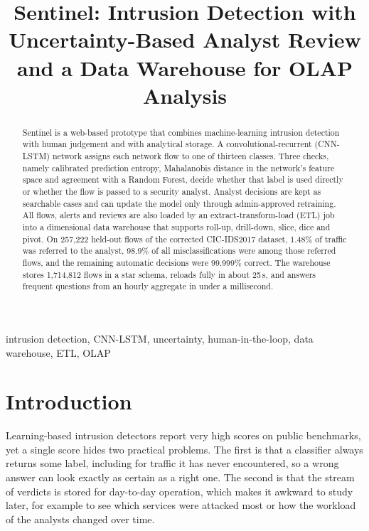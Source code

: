 \documentclass[conference]{IEEEtran}
\begin{document}
\title{Sentinel: Intrusion Detection with Uncertainty-Based Analyst Review and a Data Warehouse for OLAP Analysis}

\author{
\and
{}
}

\maketitle

\begin{abstract}
Sentinel is a web-based prototype that combines machine-learning intrusion detection with
human judgement and with analytical storage. A convolutional-recurrent (CNN-LSTM) network assigns
each network flow to one of thirteen classes. Three checks, namely calibrated prediction entropy,
Mahalanobis distance in the network's feature space and agreement with a Random Forest, decide
whether that label is used directly or whether the flow is passed to a security analyst. Analyst
decisions are kept as searchable cases and can update the model only through admin-approved
retraining. All flows, alerts and reviews are also loaded by an extract-transform-load (ETL) job
into a dimensional data warehouse that supports roll-up, drill-down, slice, dice and pivot. On
257,222 held-out flows of the corrected CIC-IDS2017 dataset, 1.48\% of traffic was referred to
the analyst, 98.9\% of all misclassifications were among those referred flows, and the remaining
automatic decisions were 99.999\% correct. The warehouse stores 1,714,812 flows in a star schema, reloads
fully in about 25\,s, and answers frequent questions from an hourly aggregate in under a
millisecond.
\end{abstract}

\begin{IEEEkeywords}
intrusion detection, CNN-LSTM, uncertainty, human-in-the-loop, data warehouse, ETL, OLAP
\end{IEEEkeywords}

\section{Introduction}
Learning-based intrusion detectors report very high scores on public benchmarks, yet a single
score hides two practical problems. The first is that a classifier always returns some label,
including for traffic it has never encountered, so a wrong answer can look exactly as certain as
a right one. The second is that the stream of verdicts is stored for day-to-day operation, which
makes it awkward to study later, for example to see which services were attacked most or how the
workload of the analysts changed over time.
\end{document}

